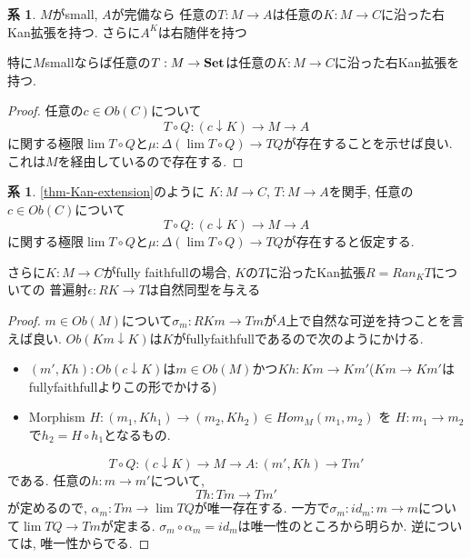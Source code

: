 \documentclass[dvipdfmx,a4paper,11pt]{report}
\theoremstyle{definition}
\newtheorem{cor}[thm]{系}
\begin{document}
 \begin{tcolorbox}
 [colback = white, colframe = green!35!black, fonttitle = \bfseries,breakable = true]
\begin{cor}
$M$がsmall, $A$が完備なら
任意の$T : M \to A$は任意の$K : M \to C$に沿った右Kan拡張を持つ. 
さらに$A^K$は右随伴を持つ

特に$M$smallならば任意の$T : M \to {\bf Set}$は任意の$K : M \to C$に沿った右Kan拡張を持つ. 
\end{cor}
\end{tcolorbox}

\begin{proof}
任意の$c \in Ob(C)$について
$$
T \circ Q : (c \downarrow K) \to M \to A
$$
に関する極限$\lim T\circ Q$と$\mu: \Delta (\lim T\circ Q) \to TQ$が存在することを示せば良い.
これは$M$を経由しているので存在する.

\end{proof}

 \begin{tcolorbox}
 [colback = white, colframe = green!35!black, fonttitle = \bfseries,breakable = true]
\begin{cor}
\ref{thm-Kan-extension}のように
$K : M \to C$, $T : M \to A$を関手, 
任意の$c \in Ob(C)$について
$$
T \circ Q : (c \downarrow K) \to M \to A
$$
に関する極限$\lim T\circ Q$と$\mu: \Delta (\lim T\circ Q) \to TQ$が存在すると仮定する.

さらに$K : M \to C$がfully faithfullの場合, 
$K$の$T$に沿ったKan拡張$R = Ran_{K}T$についての
普遍射$\epsilon : RK \to T$は自然同型を与える
\end{cor}
\end{tcolorbox}

\begin{proof}
$m \in Ob(M)$について$\sigma_m : RKm \to Tm$が$A$上で自然な可逆を持つことを言えば良い. 
$Ob(Km \downarrow K)$は$K$がfullyfaithfullであるので次のようにかける.
\begin{itemize}
\item $(m', Kh) : Ob(c \downarrow K)$は$m \in Ob(M)$かつ$Kh : Km \to Km'$($Km \to Km'$はfullyfaithfullよりこの形でかける) %
\item Morphism $H : (m_1, Kh_1)  \to (m_2,Kh_2) \in Hom_{M}(m_1,m_2) $ を 
$H: m_1 \to m_2$で$ h_2 = H \circ h_1 $となるもの.
\end{itemize}
$$
T \circ Q : (c \downarrow K) \to M \to A : (m' , Kh) \to Tm'
$$
である. 任意の$h : m \to m'$について, 
$$
Th : Tm \to Tm' 
$$
が定めるので, $\alpha_m :  Tm \to \lim TQ$が唯一存在する. 
一方で$\sigma_m : id_{m} : m \to m$について$\lim TQ \to Tm$が定まる.
$\sigma_m \circ \alpha_m = id_m$は唯一性のところから明らか. 
逆については, 唯一性からでる. 
\end{proof}
\end{document}
